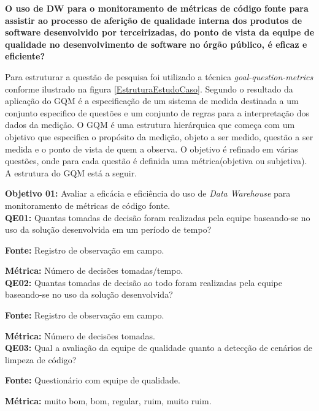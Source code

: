 \textbf{O uso de DW para o monitoramento de métricas de código fonte para assistir ao processo de aferição de qualidade interna dos produtos de software desenvolvido por terceirizadas, do ponto de vista da equipe de qualidade no desenvolvimento de software no órgão público, é eficaz e eficiente?}

Para estruturar a questão de pesquisa foi utilizado a técnica \textit{goal-question-metrics} conforme ilustrado na figura \ref{EstruturaEstudoCaso}. Segundo \cite{Basili96b} o resultado da aplicação do GQM é a especificação de um sistema de medida destinada a um conjunto especifico de questões e um conjunto de regras para a interpretação dos dados da medição. O GQM é uma estrutura hierárquica que começa com um objetivo que especifica o propósito da medição, objeto a ser medido, questão a ser medida e o ponto de vista de quem a observa. O objetivo é refinado em várias questões, onde para cada questão é definida uma métrica(objetiva ou subjetiva)\cite{Basili96b}. A estrutura do GQM está a seguir.

\textbf{Objetivo 01:} Avaliar a eficácia e eficiência do uso de \textit{Data Warehouse} para monitoramento de métricas de código fonte.\\



\textbf{QE01:} Quantas tomadas de decisão foram realizadas pela equipe baseando-se no uso da solução desenvolvida em um período de tempo?

\textbf{Fonte:} Registro de observação em campo.

\textbf{Métrica:} Número de decisões tomadas/tempo. \\



\textbf{QE02: } Quantas tomadas de decisão ao todo foram realizadas pela equipe baseando-se no uso da solução desenvolvida?

\textbf{Fonte:} Registro de observação em campo.

\textbf{Métrica:} Número de decisões tomadas.\\



\textbf{QE03: } Qual a avaliação da equipe de qualidade quanto a detecção de cenários de limpeza de código?

\textbf{Fonte:} Questionário com equipe de qualidade.

\textbf{Métrica:} muito bom, bom, regular, ruim, muito ruim.\\


